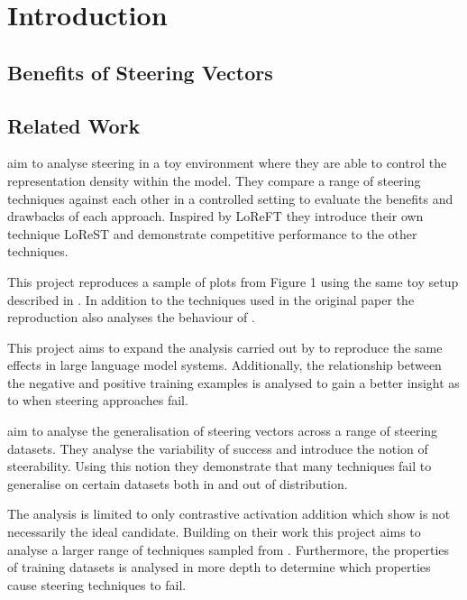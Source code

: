 \chapter{Introduction}

\section{Benefits of Steering Vectors}

\section{Related Work}

aim to analyse steering in a toy environment where they are able to control the representation density within the model.
They compare a range of steering techniques \citep{caa, reft, mimic} against each other in a controlled setting to evaluate the benefits and drawbacks of each approach.
Inspired by LoReFT \citep{reft} they introduce their own technique LoReST and demonstrate competitive performance to the other techniques.

This project reproduces a sample of plots from Figure 1 using the same toy setup described in .
In addition to the techniques used in the original paper the reproduction also analyses the behaviour of \citet{ace}.

This project aims to expand the analysis carried out by \citet{steering-clear} to reproduce the same effects in large language model systems.
Additionally, the relationship between the negative and positive training examples is analysed to gain a better insight as to when steering approaches fail.

aim to analyse the generalisation of steering vectors across a range of steering datasets.
They analyse the variability of success and introduce the notion of steerability.
Using this notion they demonstrate that many techniques fail to generalise on certain datasets both in and out of distribution.

The analysis is limited to only contrastive activation addition \citep{caa} which \citet{steering-clear} show is not necessarily the ideal candidate.
Building on their work this project aims to analyse a larger range of techniques sampled from \citet{steering-clear}.
Furthermore, the properties of training datasets is analysed in more depth to determine which properties cause steering techniques to fail.

